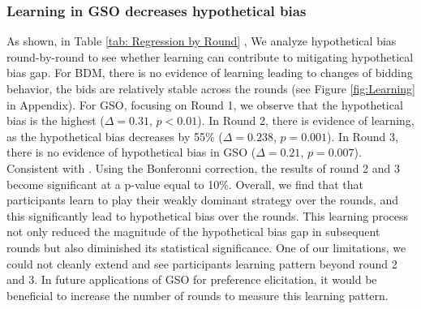 \documentclass[12pt]{article}
\begin{document}
\subsubsection{Learning in GSO decreases hypothetical bias}
As shown, in Table \ref{tab: Regression by Round} , We analyze hypothetical bias round-by-round to see whether learning can contribute to mitigating hypothetical bias gap. For BDM, there is no evidence of learning leading to changes of bidding behavior, the bids are relatively stable across the rounds (see Figure \ref{fig:Learning} in Appendix).
For GSO, focusing on Round 1, we observe that the hypothetical bias is the highest (\(\Delta = 0.31\), \(p < 0.01\)). In Round 2, there is evidence of learning, as the hypothetical bias decreases by 55\% (\(\Delta = 0.238\), \(p = 0.001\)). In Round 3, there is no evidence of hypothetical bias in GSO (\(\Delta = 0.21\), \(p = 0.007\)). Consistent with \citet{brown_is_2023}. Using the Bonferonni correction, the results of round 2 and 3 become significant at a p-value equal to 10\%. Overall, we find that that participants learn to play their weakly dominant strategy over the rounds, and this significantly lead to hypothetical bias over the rounds. This learning process not only reduced the magnitude of the hypothetical bias gap in subsequent rounds but also diminished its statistical significance. One of our limitations, we could not cleanly extend and see participants learning pattern beyond round 2 and 3. In future applications of GSO for preference elicitation, it would be beneficial to increase the number of rounds to measure this learning pattern.
\end{document}
